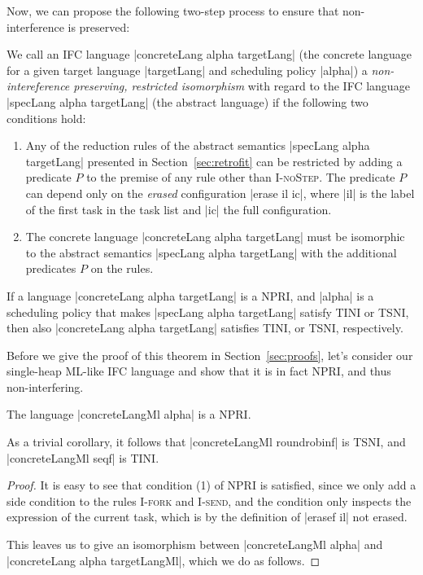 Now, we can propose the following two-step process to ensure that
non-interference is preserved:
\begin{definition}
  \label{def:npri}
  We call an IFC language
  |concreteLang alpha targetLang| (the concrete language for a given
  target language |targetLang| and scheduling policy |alpha|)
  a \textit{non-intereference preserving,
  restricted isomorphism} with regard to the IFC language
  |specLang alpha targetLang|
  (the abstract language) if the following
  two conditions hold:
  \begin{enumerate}
    \item Any of the reduction rules of the abstract
    semantics |specLang alpha targetLang|
    presented in Section~\ref{sec:retrofit} can
    be restricted by adding a predicate $P$ to the premise of
    any rule other than \textsc{I-noStep}.  The predicate $P$
    can depend only on the \textit{erased} configuration
    |erase il ic|, where |il| is the label of the first task
    in the task list and |ic| the full configuration.
    \item The concrete language
    |concreteLang alpha targetLang|
    must be isomorphic to the abstract semantics |specLang alpha targetLang|
    with the additional predicates $P$ on the rules.
  \end{enumerate}
\end{definition}

\begin{theorem}
  \label{thm:npri}
  If a language |concreteLang alpha targetLang| is a NPRI, and |alpha|
  is a scheduling policy that makes |specLang alpha targetLang| satisfy
  TINI or TSNI, then also
  |concreteLang alpha targetLang| satisfies TINI, or TSNI, respectively.
\end{theorem}

Before we give the proof of this theorem in Section~\ref{sec:proofs},
let's consider our single-heap ML-like IFC language and
show that it is in fact NPRI, and thus non-interfering.

\begin{theorem}
  The language |concreteLangMl alpha| is a NPRI.
\end{theorem}
As a trivial corollary, it follows that |concreteLangMl roundrobinf| is
TSNI, and |concreteLangMl seqf| is TINI.

\begin{proof}
  It is easy to see that condition (1) of NPRI is satisfied, since
  we only add a side condition to the rules \textsc{I-fork} and
  \textsc{I-send}, and the condition only inspects the expression
  of the current task, which is by the definition of |erasef il| not
  erased.
  
  This leaves us to give an isomorphism between |concreteLangMl alpha|
  and |concreteLang alpha targetLangMl|, which we do as follows.
\end{proof}


